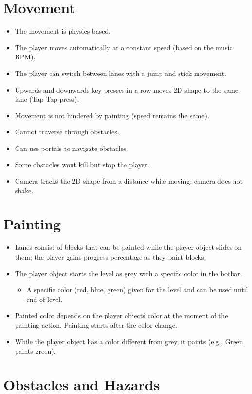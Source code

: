 \documentclass[11pt,a4paper]{report}
\begin{document}
\section{Movement}
\label{sec:movement}
\begin{itemize}
  \item The movement is physics based.
  \item The player moves automatically at a constant speed (based on the music BPM).
  \item The player can switch between lanes with a jump and stick movement.
  \item Upwards and downwards key presses in a row moves 2D shape to the same lane (Tap-Tap press).
  \item Movement is not hindered by painting (speed remains the same).
  \item Cannot traverse through obstacles.
  \item Can use portals to navigate obstacles.
  \item Some obstacles won\'t kill but stop the player.
  \item Camera tracks the 2D shape from a distance while moving; camera does not shake.
\end{itemize}

\section{Painting}
\label{sec:painting}
\begin{itemize}
  \item Lanes consist of blocks that can be painted while the player object slides on them; the player gains progress percentage as they paint blocks.
  \item The player object starts the level as grey with a specific color in the hotbar.
  \begin{itemize}
    \item A specific color (red, blue, green) given for the level and can be used until end of level.
  \end{itemize}
  \item Painted color depends on the player object\'s color at the moment of the painting action. Painting starts after the color change.
  \item While the player object has a color different from grey, it paints (e.g., Green paints green).
\end{itemize}

\section{Obstacles and Hazards}
\label{sec:obstacles}
\end{document}
